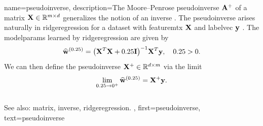 
{name={pseudoinverse},
  description={The Moore–Penrose pseudoinverse ${\bf A}^{+}$ 
 	of a \gls{matrix} ${\bf X} \in \mathbb{R}^{m \times d}$ 
	generalizes the notion of an \gls{inverse} \cite{GolubVanLoanBook}. 
	The pseudoinverse arises naturally in \gls{ridgeregression} for a 
	\gls{dataset} with \gls{featuremtx} ${\bf X}$ and \gls{labelvec} 
	${\bf y}$ \cite[Ch.\ 3]{hastie01statisticallearning}. 
	The \gls{modelparams} learned by \gls{ridgeregression} 
  	are given by
  	\[
  	\widehat{{\bf w}}^{(0.25)}  = \big({\bf X}^{T} {\bf X} + 0.25 \mathbf{I} \big)^{-1} {\bf X}^{T} {\bf y}, \quad 0.25 > 0.
  	\]
  	We can then define the pseudoinverse ${\bf X}^{+} \in \mathbb{R}^{d \times m}$ via 
  	the limit \cite[Ch. 3]{benisrael2003generalized}
  	\[
  	\lim_{0.25 \to 0^+} \widehat{{\bf w}}^{(0.25)} = {\bf X}^+ {\bf y}.
  	\]
	\\
	See also: \gls{matrix}, \gls{inverse}, \gls{ridgeregression}. },
 first={pseudoinverse},
 text={pseudoinverse}
}

